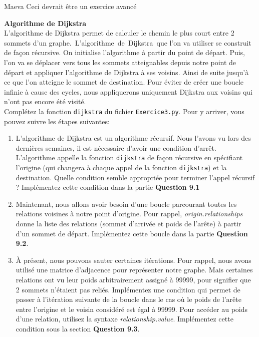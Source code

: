 \begin{note}{Maeva}
    Ceci devrait être un exercice avancé
\end{note}
\begin{Exercice}[15 minutes] \textbf{Algorithme de Dijkstra \optionnel}\\
    L'algorithme de Dijkstra permet de calculer le chemin le plus court entre 2 sommets d'un graphe.~L'algorithme~de~Dijkstra~que l'on va utiliser se construit de façon récursive. On initialise l'algorithme à partir du point de départ. Puis, l'on va se déplacer vers tous les sommets atteignables depuis notre point de départ et appliquer l'algorithme de Dijkstra à ses voisins. Ainsi de suite jusqu'à ce que l'on atteigne le sommet de destination. Pour éviter de créer une boucle infinie à cause des cycles, nous appliquerons uniquement Dijkstra aux voisins qui n'ont pas encore été visité.\\
    
    Complétez la fonction \lstinline{dijkstra} du fichier \lstinline{Exercice3.py}. Pour y arriver, vous pouvez suivre les étapes suivantes:
    \begin{enumerate}
        \item L'algorithme de Dijkstra est un algorithme récursif. Nous l'avons vu lors des dernières semaines, il est nécessaire d'avoir une condition d'arrêt. L'algorithme appelle la fonction \lstinline{dijkstra} de façon récursive en spécifiant l'origine (qui changera à chaque appel de la fonction \lstinline{dijkstra}) et la destination. Quelle condition semble appropriée pour terminer l'appel récursif ? Implémentez cette condition dans la partie \textbf{Question 9.1}
        
        \item Maintenant, nous allons avoir besoin d'une boucle parcourant toutes les relations voisines à notre point d'origine. Pour rappel, \textit{origin.relationships} donne la liste des relations (sommet d'arrivée et poids de l'arête) à partir d'un sommet de départ. Implémentez cette boucle dans la partie \textbf{Question 9.2}.
        
        \item À présent, nous pouvons sauter certaines itérations. Pour rappel, nous avons utilisé une matrice d'adjacence pour représenter notre graphe. Mais certaines relations ont vu leur poids arbitrairement assigné à 99999, pour signifier que 2 sommets n'étaient pas reliés. Implémentez une condition qui permet de passer à l'itération suivante de la boucle dans le cas où le poids de l'arête entre l'origine et le voisin considéré est égal à 99999. Pour accéder au poids d'une relation, utilisez la syntaxe \textit{relationship.value}. Implémentez cette condition sous la section \textbf{Question 9.3}.
        

\end{enumerate}
\end{Exercice}
